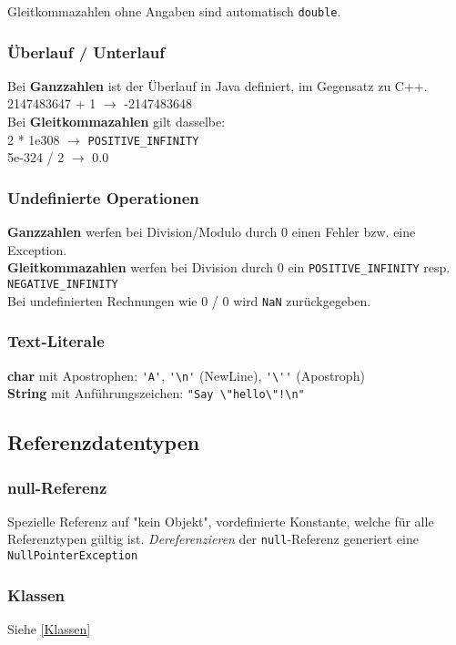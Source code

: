 Gleitkommazahlen ohne Angaben sind automatisch \verb|double|.

\subsubsection{Überlauf / Unterlauf}
Bei \textbf{Ganzzahlen} ist der Überlauf in Java definiert, im Gegensatz zu C++.\\
2147483647 + 1 $ \rightarrow $ -2147483648\\

Bei \textbf{Gleitkommazahlen} gilt dasselbe:\\
2 * 1e308 $ \rightarrow $ \verb|POSITIVE_INFINITY|\\
5e-324 / 2 $ \rightarrow $ 0.0

\subsubsection{Undefinierte Operationen}
\textbf{Ganzzahlen} werfen bei Division/Modulo durch 0 einen Fehler bzw. eine Exception.\\

\textbf{Gleitkommazahlen} werfen bei Division durch 0 ein \verb|POSITIVE_INFINITY| resp. \verb|NEGATIVE_INFINITY|\\
Bei undefinierten Rechnungen wie 0 / 0 wird \verb|NaN| zurückgegeben.

\subsubsection{Text-Literale}
\textbf{char} mit Apostrophen: \verb|'A'|, \verb|'\n'| (NewLine), \verb|'\''| (Apostroph) \\

\textbf{String} mit Anführungszeichen: \verb|"Say \"hello\"!\n"|

\subsection{Referenzdatentypen}

\subsubsection{null-Referenz}
Spezielle Referenz auf "kein Objekt", vordefinierte Konstante, welche für alle Referenztypen gültig ist. \textit{Dereferenzieren} der
\verb|null|-Referenz generiert eine \verb|NullPointerException|

\subsubsection{Klassen}
Siehe \ref{Klassen}

